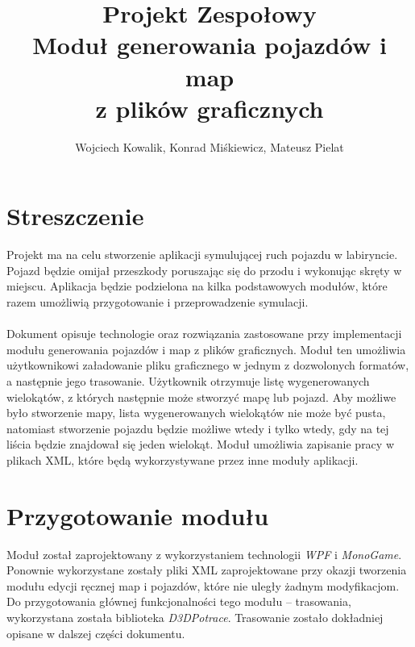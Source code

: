 \documentclass{article}
\let\oldsection\section
\renewcommand\section{\clearpage\oldsection} %
\begin{document}
\title{\textbf{Projekt Zespołowy}\\Moduł generowania pojazdów i map\\z plików graficznych}
\author{Wojciech Kowalik, Konrad Miśkiewicz, Mateusz Pielat}
\maketitle



\tableofcontents


\section{Streszczenie}
Projekt ma na celu stworzenie aplikacji symulującej ruch pojazdu w labiryncie. Pojazd będzie omijał przeszkody poruszając się do przodu i wykonując skręty w miejscu. Aplikacja będzie podzielona na kilka podstawowych modułów, które razem umożliwią przygotowanie i przeprowadzenie symulacji.
\\\\Dokument opisuje technologie oraz rozwiązania zastosowane przy implementacji modułu generowania pojazdów i map z plików graficznych. Moduł ten umożliwia użytkownikowi załadowanie pliku graficznego w jednym z dozwolonych formatów, a następnie jego trasowanie. Użytkownik otrzymuje listę wygenerowanych wielokątów, z których następnie może stworzyć mapę lub pojazd. Aby możliwe było stworzenie mapy, lista wygenerowanych wielokątów nie może być pusta, natomiast stworzenie pojazdu będzie możliwe wtedy i tylko wtedy, gdy na tej liścia będzie znajdował się jeden wielokąt. Moduł umożliwia zapisanie pracy w plikach XML, które będą wykorzystywane przez inne moduły aplikacji.


\section{Przygotowanie modułu}

Moduł został zaprojektowany z wykorzystaniem technologii \textit{WPF} i \textit{MonoGame}. Ponownie wykorzystane zostały pliki XML zaprojektowane przy okazji tworzenia modułu edycji ręcznej map i pojazdów, które nie uległy żadnym modyfikacjom. Do przygotowania głównej funkcjonalności tego modułu – trasowania, wykorzystana została biblioteka \textit{D3DPotrace}. Trasowanie zostało dokładniej opisane w dalszej części dokumentu.
\end{document}
